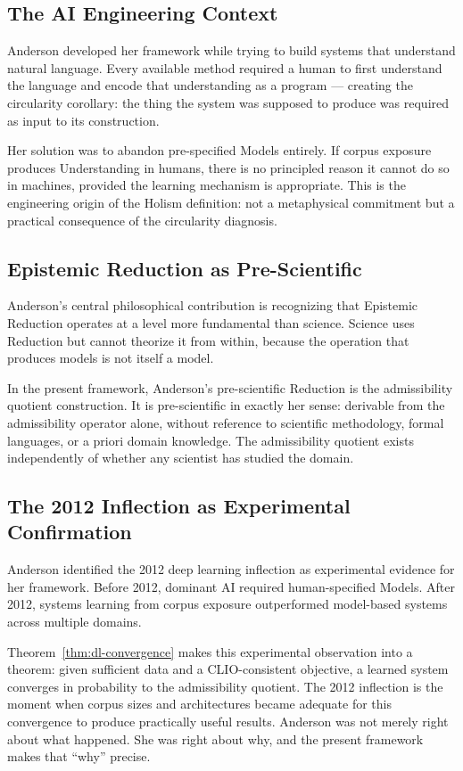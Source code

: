 \documentclass[12pt, a4paper, oneside]{book}
\begin{document}
\subsection{The AI Engineering Context}

Anderson developed her framework while trying to build systems that
understand natural language. Every available method required a human
to first understand the language and encode that understanding as a
program --- creating the circularity corollary: the thing the system was
supposed to produce was required as input to its construction.

Her solution was to abandon pre-specified Models entirely. If corpus
exposure produces Understanding in humans, there is no principled reason
it cannot do so in machines, provided the learning mechanism is
appropriate. This is the engineering origin of the Holism definition:
not a metaphysical commitment but a practical consequence of the
circularity diagnosis.

\subsection{Epistemic Reduction as Pre-Scientific}

Anderson's central philosophical contribution is recognizing that
Epistemic Reduction operates at a level more fundamental than science.
Science uses Reduction but cannot theorize it from within, because the
operation that produces models is not itself a model.

In the present framework, Anderson's pre-scientific Reduction is the
admissibility quotient construction. It is pre-scientific in exactly
her sense: derivable from the admissibility operator alone, without
reference to scientific methodology, formal languages, or a priori domain
knowledge. The admissibility quotient exists independently of whether
any scientist has studied the domain.

\subsection{The 2012 Inflection as Experimental Confirmation}

Anderson identified the 2012 deep learning inflection as experimental
evidence for her framework. Before 2012, dominant AI required
human-specified Models. After 2012, systems learning from corpus
exposure outperformed model-based systems across multiple domains.

Theorem~\ref{thm:dl-convergence} makes this experimental observation
into a theorem: given sufficient data and a CLIO-consistent objective,
a learned system converges in probability to the admissibility quotient.
The 2012 inflection is the moment when corpus sizes and architectures
became adequate for this convergence to produce practically useful
results. Anderson was not merely right about what happened. She was
right about why, and the present framework makes that ``why'' precise.
\end{document}
